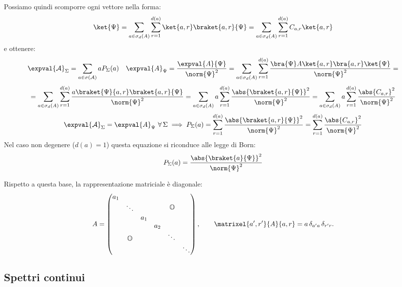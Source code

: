 Possiamo quindi scomporre ogni vettore nella forma:
\begin{equation}
    \ket{\Psi} = \sum_{a \in \sigma_d(A)}  \sum_{r=1}^{d(a)} \ket{a,r}\braket{a,r}{\Psi}= \sum_{a \in \sigma_d(A)}\sum_{r=1}^{d(a)}    C_{a,r} \ket{a,r}
\end{equation}
e ottenere:
\[
    \expval{\mathcal{A}}_{\Sigma}= \sum_{a \in \sigma(\mathcal{A})} a P_{\Sigma}(a) \quad \expval{A}_{\Psi} = \frac{\expval{A}{\Psi}}{\norm{\Psi}^2} =
    \sum_{a \in \sigma_d(A)}\sum_{r=1}^{d(a)}\frac{\bra{\Psi}A \ket{a,r}\bra{a,r}\ket{\Psi}}{\norm{\Psi}^2} = 
\]
\[
    = \sum_{a \in \sigma_d(A)} \sum_{r=1}^{d(a)}\frac{a \braket{\Psi}{a,r}\braket{a,r}{\Psi}}{\norm{\Psi}^2}=
    \sum_{a \in \sigma_d(A)} a \sum_{r=1}^{d(a)} \frac{\abs{\braket{a,r}{\Psi}}^2}{\norm{\Psi}^2}
    =\sum_{a \in \sigma_d(A)} a \sum_{r=1}^{d(a)} \frac{\abs{C_{a,r}}^2}{\norm{\Psi}^2}
\]
\begin{equation}
    \expval{\mathcal{A}}_\Sigma = \expval{A}_\Psi \ \forall\,\Sigma  \implies P_\Sigma(a)   = \sum_{r=1}^{d(a)} \frac{\abs{\braket{a,r}{\Psi}}^2}{\norm{\Psi}^2}=
        \sum_{r=1}^{d(a)} \frac{\abs{C_{a,r}}^2}{\norm{\Psi}^2}
\end{equation}
Nel caso non degenere (\(d(a)=1\))  questa equazione si riconduce alle legge di Born: 
\begin{equation}
    P_\Sigma(a)= \frac{\abs{\braket{a}{\Psi}}^2}{\norm{\Psi}^2}
\end{equation}

Rispetto a questa base, la rappresentazione matriciale è diagonale:
\begin{equation}
    A =
    \begin{pmatrix}
    \begin{matrix}
        a_1& & \\
        & \ddots &\\
        & & a_1
    \end{matrix} &\mathbb{O}\\
    \mathbb{O} & \begin{matrix}
        a_2& & \\
        & \ddots &\\
        & & \ddots
    \end{matrix} 
    \end{pmatrix},
    \qquad
    \matrixel{a',r'}{A}{a,r} = a\,\delta_{a'a}\,\delta_{r'r}.
\end{equation}

\subsection{Spettri continui}


